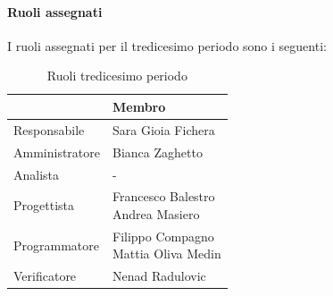 \documentclass[a4paper,12pt]{article}
\begin{document}
            \paragraph{Ruoli assegnati}
            I ruoli assegnati per il tredicesimo periodo sono i seguenti:
                \begin{table}[H]
                \centering
                \caption{Ruoli tredicesimo periodo}
                \begin{tabular}{|l|l|}
                \hline
                    \rowcolor{lightgray}{\textbf{Ruolo}} & {\textbf{Membro}} \\
                \hline
                    Responsabile & Sara Gioia Fichera \\
                \hline
                    Amministratore & Bianca Zaghetto  \\
                \hline
                    Analista & - \\
                \hline
                    Progettista & \makecell[l]{ Francesco Balestro \\ Andrea Masiero }  \\
                \hline
                    Programmatore & \makecell[l]{ Filippo Compagno \\ Mattia Oliva Medin } \\
                \hline
                    Verificatore & Nenad Radulovic \\
                \hline
                \end{tabular}
                \end{table}
                
\end{document}
